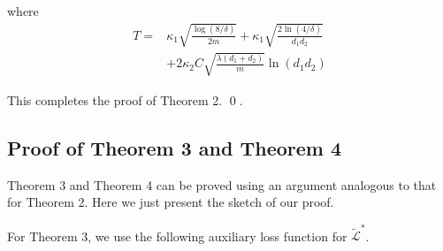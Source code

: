\documentclass[conference]{IEEEtran}
\numberwithin{equation}{section}
\newtheorem{sampling strategy}{Sampling Strategy}
\begin{document}
where
\begin{align}
T = & \kappa_1 \sqrt{\frac{\log(8/\delta)}{2m}} + \kappa_1 \sqrt{ \frac{2\ln(4/\delta) }{d_1 d_2} } \nonumber \\
      & + 2 \kappa_2 C \sqrt{\frac{\lambda(d_1 + d_2)}{m}} \ln(d_1 d_2) \nonumber 
\end{align}

This completes the proof of Theorem 2. \qed  .%






\subsection{Proof of Theorem 3 and Theorem 4}

Theorem 3 and Theorem 4 can be proved using an argument analogous to that for Theorem 2. Here we just present the sketch of our proof.

For Theorem 3, we use the following auxiliary loss function for $\tilde{\mathcal{L}}^*$.
\end{document}
